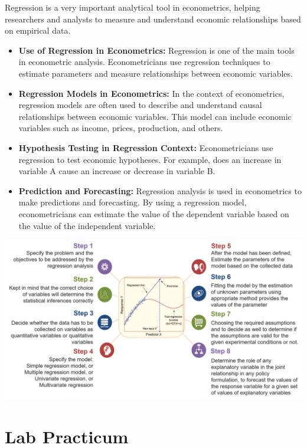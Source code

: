 \documentclass[
]{book}
\providecommand{\tightlist}{%
  \setlength{\itemsep}{0pt}\setlength{\parskip}{0pt}}
\begin{document}
Regression is a very important analytical tool in econometrics, helping researchers and analysts to measure and understand economic relationships based on empirical data.

\begin{itemize}
\tightlist
\item
  \textbf{Use of Regression in Econometrics:} Regression is one of the main tools in econometric analysis. Econometricians use regression techniques to estimate parameters and measure relationships between economic variables.
\item
  \textbf{Regression Models in Econometrics:} In the context of econometrics, regression models are often used to describe and understand causal relationships between economic variables. This model can include economic variables such as income, prices, production, and others.
\item
  \textbf{Hypothesis Testing in Regression Context:} Econometricians use regression to test economic hypotheses. For example, does an increase in variable A cause an increase or decrease in variable B.
\item
  \textbf{Prediction and Forecasting:} Regression analysis is used in econometrics to make predictions and forecasting. By using a regression model, econometricians can estimate the value of the dependent variable based on the value of the independent variable.
\end{itemize}

\begin{center}\includegraphics[width=1\linewidth]{images/Bab1/regression} \end{center}

\hypertarget{lab-practicum}{%
\section{Lab Practicum}\label{lab-practicum}}
\end{document}
